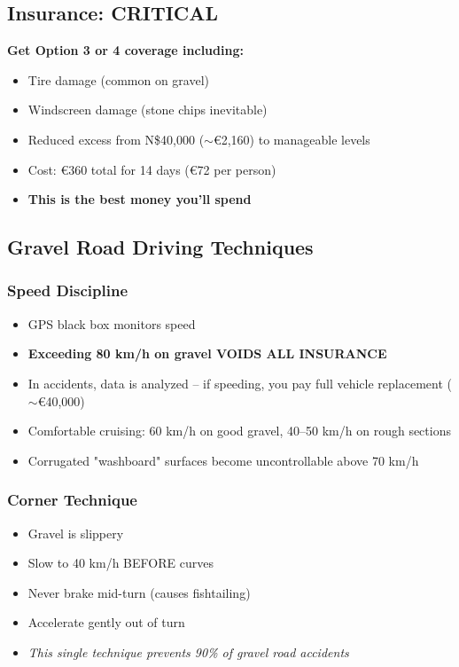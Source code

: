 \documentclass[11pt]{article}
\begin{document}
\subsection{Insurance: CRITICAL}

\textbf{Get Option 3 or 4 coverage including:}
\begin{itemize}
    \item Tire damage (common on gravel)
    \item Windscreen damage (stone chips inevitable)
    \item Reduced excess from N\$40,000 ($\sim$€2,160) to manageable levels
    \item Cost: €360 total for 14 days (€72 per person)
    \item \textbf{This is the best money you'll spend}
\end{itemize}

\subsection{Gravel Road Driving Techniques}

\subsubsection{Speed Discipline}

\begin{itemize}
    \item GPS black box monitors speed
    \item \textcolor{warningcolor}{\textbf{Exceeding 80 km/h on gravel VOIDS ALL INSURANCE}}
    \item In accidents, data is analyzed -- if speeding, you pay full vehicle replacement ($\sim$€40,000)
    \item Comfortable cruising: 60 km/h on good gravel, 40--50 km/h on rough sections
    \item Corrugated "washboard" surfaces become uncontrollable above 70 km/h
\end{itemize}

\subsubsection{Corner Technique}

\begin{itemize}
    \item Gravel is slippery
    \item Slow to 40 km/h BEFORE curves
    \item Never brake mid-turn (causes fishtailing)
    \item Accelerate gently out of turn
    \item \textit{This single technique prevents 90\% of gravel road accidents}
\end{itemize}
\end{document}
